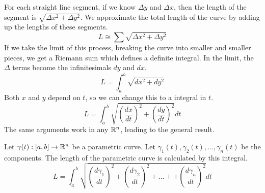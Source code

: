 \documentclass[fleqn,letterpaper]{report}
\begin{document}
For each straight line segment, if we know $\Delta y$ and
$\Delta x$, then the length of the segment is $\sqrt{\Delta
x^2 + \Delta y^2}$.
We approximate the total length of the curve by adding up
the lengths of these segments.
\begin{equation*}
L \cong \sum \sqrt{\Delta x^2 + \Delta y^2}
\end{equation*}
If we take the limit of this process, breaking the curve into
smaller and smaller pieces, we get a Riemann sum which defines a
definite integral. In the limit, the $\Delta$ terms become the
infinitesimals $dy$ and $dx$. 
\begin{equation*}
L = \int_a^b \sqrt{dx^2 + dy^2}
\end{equation*}
Both $x$ and $y$ depend on $t$, so we can change this to a
integral in $t$.
\begin{equation*}
L = \int_a^b \sqrt{ \left( \frac{dx}{dt} \right)^2 + \left(
\frac{dy}{dt} \right)^2 } dt 
\end{equation*}
The same arguments work in any $\mathbb{R}^n$, leading to the general
result.

\begin{prop}
Let $\gamma(t): [a,b] \rightarrow \mathbb{R}^n$ be a parametric
curve. Let $\gamma_1(t), \gamma_2(t), \ldots, \gamma_n(t)$ be
the components. The length of the parametric curve is
calculated by this integral.
\begin{equation*}
L = \int_a^b \sqrt{ \left( \frac{d\gamma_1}{dt} \right)^2 
+ \left( \frac{d\gamma_2}{dt} \right)^2 + \ldots + 
+ \left( \frac{d\gamma_n}{dt} \right)^2 } dt 
\end{equation*}
\end{prop}
\end{document}
